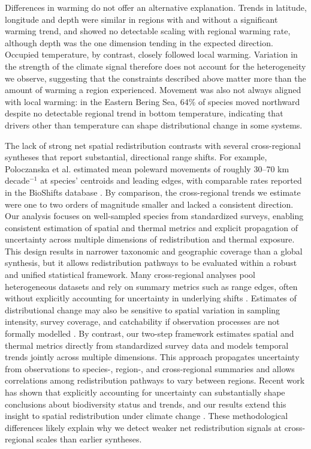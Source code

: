 \documentclass[9pt,twocolumn,twoside]{pnas-new}
\begin{document}
Differences in warming do not offer an alternative explanation. Trends in latitude, longitude and depth were similar in regions with and without a significant warming trend, and showed no detectable scaling with regional warming rate, although depth was the one dimension tending in the expected direction. Occupied temperature, by contrast, closely followed local warming. Variation in the strength of the climate signal therefore does not account for the heterogeneity we observe, suggesting that the constraints described above matter more than the amount of warming a region experienced. Movement was also not always aligned with local warming: in the Eastern Bering Sea, 64\% of species moved northward despite no detectable regional trend in bottom temperature, indicating that drivers other than temperature can shape distributional change in some systems.

The lack of strong net spatial redistribution contrasts with several cross-regional syntheses that report substantial, directional range shifts. For example, Poloczanska et al. \citep{poloczanska_global_2013} estimated mean poleward movements of roughly 30--70 km decade$^{-1}$ at species' centroids and leading edges, with comparable rates reported in the BioShifts database \citep{lenoir_species_2020}. By comparison, the cross-regional trends we estimate were one to two orders of magnitude smaller and lacked a consistent direction. Our analysis focuses on well-sampled species from standardized surveys, enabling consistent estimation of spatial and thermal metrics and explicit propagation of uncertainty across multiple dimensions of redistribution and thermal exposure. This design results in narrower taxonomic and geographic coverage than a global synthesis, but it allows redistribution pathways to be evaluated within a robust and unified statistical framework. Many cross-regional analyses pool heterogeneous datasets and rely on summary metrics such as range edges, often without explicitly accounting for uncertainty in underlying shifts \citep{brown_ecological_2016, lenoir_species_2020, dahms_temperature_2023}. Estimates of distributional change may also be sensitive to spatial variation in sampling intensity, survey coverage, and catchability if observation processes are not formally modelled \citep{thorson_model-based_2016}. By contrast, our two-step framework estimates spatial and thermal metrics directly from standardized survey data and models temporal trends jointly across multiple dimensions. This approach propagates uncertainty from observations to species-, region-, and cross-regional summaries and allows correlations among redistribution pathways to vary between regions. Recent work has shown that explicitly accounting for uncertainty can substantially shape conclusions about biodiversity status and trends, and our results extend this insight to spatial redistribution under climate change \citep{johnson_revealing_2024}. These methodological differences likely explain why we detect weaker net redistribution signals at cross-regional scales than earlier syntheses.
\end{document}
